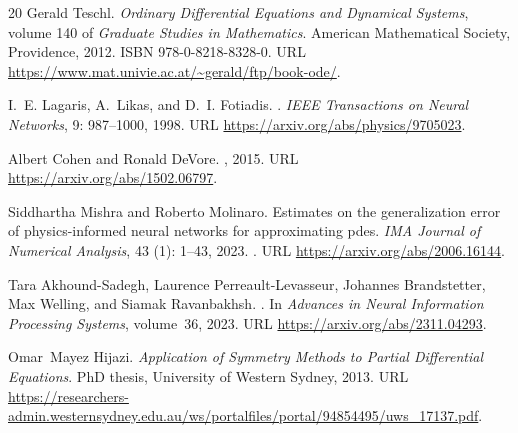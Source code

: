 \documentclass[12pt,a4paper,oneside]{report}
\numberwithin{equation}{chapter}
\begin{document}
\begin{thebibliography}{20}
Gerald Teschl.
\newblock \emph{Ordinary Differential Equations and Dynamical Systems}, volume
  140 of \emph{Graduate Studies in Mathematics}.
\newblock American Mathematical Society, Providence, 2012.
\newblock ISBN 978-0-8218-8328-0.
\newblock URL \url{https://www.mat.univie.ac.at/~gerald/ftp/book-ode/}.

I.~E. Lagaris, A.~Likas, and D.~I. Fotiadis.
.
\newblock \emph{IEEE Transactions on Neural Networks}, 9: 987--1000,
  1998.
\newblock URL \url{https://arxiv.org/abs/physics/9705023}.

Albert Cohen and Ronald DeVore.
, 2015.
\newblock URL \url{https://arxiv.org/abs/1502.06797}.

Siddhartha Mishra and Roberto Molinaro.
\newblock Estimates on the generalization error of physics-informed neural
  networks for approximating pdes.
\newblock \emph{IMA Journal of Numerical Analysis}, 43 (1):
  1--43, 2023.
\newblock {}.
\newblock URL \url{https://arxiv.org/abs/2006.16144}.

Tara Akhound-Sadegh, Laurence Perreault-Levasseur, Johannes Brandstetter, Max
  Welling, and Siamak Ravanbakhsh.
.
\newblock In \emph{Advances in Neural Information Processing Systems},
  volume~36, 2023.
\newblock URL \url{https://arxiv.org/abs/2311.04293}.

Omar~Mayez Hijazi.
\newblock \emph{{Application of Symmetry Methods to Partial Differential
  Equations}}.
\newblock PhD thesis, University of Western Sydney, 2013.
\newblock URL
  \url{https://researchers-admin.westernsydney.edu.au/ws/portalfiles/portal/94854495/uws_17137.pdf}.

\end{thebibliography}
\endgroup
\end{document}
